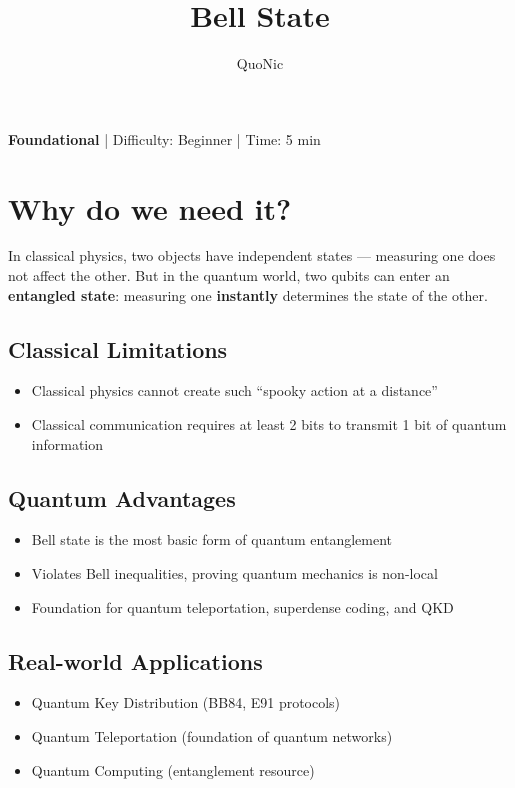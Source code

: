 \documentclass[12pt,a4paper]{article}
\title{Bell State}
\author{QuoNic}
\date{}
\begin{document}
\maketitle

\begin{center}
\textbf{Foundational} | Difficulty: Beginner | Time: 5 min
\end{center}

\tableofcontents
\newpage

\section{Why do we need it?}

In classical physics, two objects have independent states — measuring one does not affect the other. But in the quantum world, two qubits can enter an \textbf{entangled state}: measuring one \textbf{instantly} determines the state of the other.

\subsection{Classical Limitations}
\begin{itemize}
  \item Classical physics cannot create such ``spooky action at a distance''
  \item Classical communication requires at least 2 bits to transmit 1 bit of quantum information
\end{itemize}

\subsection{Quantum Advantages}
\begin{itemize}
  \item Bell state is the most basic form of quantum entanglement
  \item Violates Bell inequalities, proving quantum mechanics is non-local
  \item Foundation for quantum teleportation, superdense coding, and QKD
\end{itemize}

\subsection{Real-world Applications}
\begin{itemize}
  \item Quantum Key Distribution (BB84, E91 protocols)
  \item Quantum Teleportation (foundation of quantum networks)
  \item Quantum Computing (entanglement resource)
\end{itemize}
\end{document}
